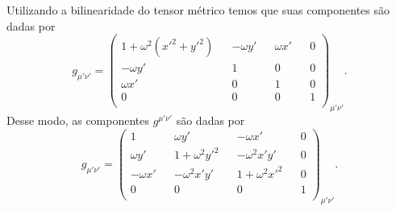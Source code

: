 Utilizando a bilinearidade do tensor métrico temos que suas componentes são dadas por
\begin{equation*}
    g_{\mu'\nu'} = \begin{pmatrix}
        1 + \omega^2(x'^2 + y'^2) && -\omega y' && \omega x' && 0\\
        -\omega y' && 1 && 0 && 0\\
        \omega x' && 0 && 1 && 0\\
        0 && 0 && 0 && 1\\
    \end{pmatrix}_{\mu'\nu'}.
\end{equation*}
Desse modo, as componentes \(g^{\mu'\nu'}\) são dadas por
\begin{equation*}
    g_{\mu'\nu'} = \begin{pmatrix}
        1 && \omega y' && -\omega x' && 0\\
        \omega y' && 1+\omega^2 y'^2 && -\omega^2x'y' && 0\\
        -\omega x' && -\omega^2x'y' && 1+\omega^2 x'^2 && 0\\
        0 && 0 && 0 && 1\\
    \end{pmatrix}_{\mu'\nu'}.
\end{equation*}
